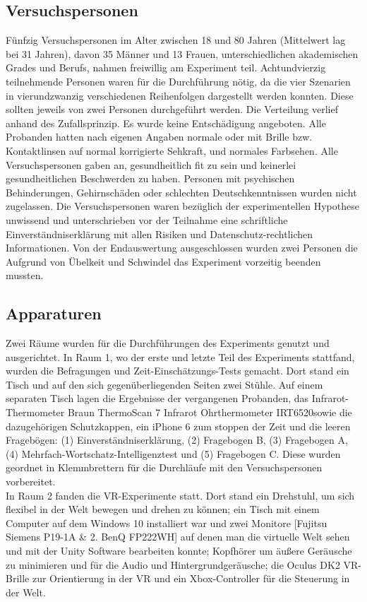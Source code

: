 \documentclass{Paper}
\begin{document}
	\subsection{Versuchspersonen}
		Fünfzig Versuchspersonen im Alter zwischen 18 und 80 Jahren (Mittelwert lag bei 31 Jahren),
		davon 35 Männer und 13 Frauen, unterschiedlichen akademischen Grades und Berufs, nahmen
		freiwillig am Experiment teil. Achtundvierzig teilnehmende Personen waren für die
		Durchführung nötig, da die vier Szenarien in vierundzwanzig verschiedenen Reihenfolgen
		dargestellt werden konnten. Diese sollten jeweils von zwei Personen durchgeführt werden. Die
		Verteilung verlief anhand des Zufallsprinzip. Es wurde keine Entschädigung angeboten. Alle
		Probanden hatten nach eigenen Angaben normale oder mit Brille bzw. Kontaktlinsen auf
		normal korrigierte Sehkraft, und normales Farbsehen. Alle Versuchspersonen gaben an,
		gesundheitlich fit zu sein und keinerlei gesundheitlichen Beschwerden zu haben. Personen mit
		psychischen Behinderungen, Gehirnschäden oder schlechten Deutschkenntnissen wurden nicht
		zugelassen. Die Versuchspersonen waren bezüglich der experimentellen Hypothese unwissend
		und unterschrieben vor der Teilnahme eine schriftliche Einverständniserklärung mit allen
		Risiken und Datenschutz-rechtlichen Informationen.
		Von der Endauswertung ausgeschlossen wurden zwei Personen die Aufgrund von Übelkeit und
		Schwindel das Experiment vorzeitig beenden mussten.
		\par
	\subsection{Apparaturen}
		Zwei Räume wurden für die Durchführungen des Experiments genutzt und ausgerichtet. In
		Raum 1, wo der erste und letzte Teil des Experiments stattfand, wurden die Befragungen und Zeit-Einschätzungs-Tests gemacht. Dort stand ein Tisch und auf den sich gegenüberliegenden
		Seiten zwei Stühle. Auf einem separaten Tisch lagen die Ergebnisse der vergangenen
		Probanden, das Infrarot-Thermometer \glqq Braun ThermoScan 7 Infrarot Ohrthermometer
		IRT6520\grqq sowie die dazugehörigen Schutzkappen, ein iPhone 6 zum stoppen der Zeit und die
		leeren Fragebögen: (1) Einverständniserklärung, (2) \glqq Fragebogen B\grqq, (3) \glqq Fragebogen A\grqq, (4)
		Mehrfach-Wortschatz-Intelligenztest und (5) \glqq Fragebogen C\grqq.
		Diese wurden geordnet in Klemmbrettern für die Durchläufe mit den Versuchspersonen
		vorbereitet. \\
		In Raum 2 fanden die VR-Experimente statt. Dort stand ein Drehstuhl, um sich flexibel in der
		Welt bewegen und drehen zu können; ein Tisch mit einem Computer auf dem Windows 10
		installiert war und zwei Monitore [Fujitsu Siemens P19-1A \& 2. BenQ FP222WH] auf denen man
		die virtuelle Welt sehen und mit der Unity Software bearbeiten konnte; Kopfhörer um äußere
		Geräusche zu minimieren und für die Audio und Hintergrundgeräusche; die Oculus DK2 VR-Brille
		zur Orientierung in der VR und ein Xbox-Controller für die Steuerung in der Welt.
\end{document}
